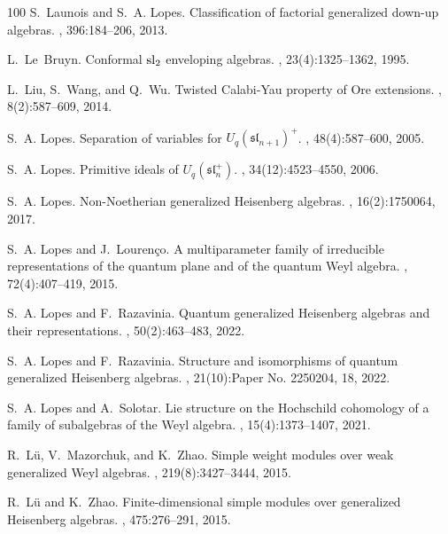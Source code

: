 \documentclass{commat}
\begin{document}
\begin{thebibliography}{100}
S.~Launois and S.~A. Lopes.
\newblock Classification of factorial generalized down-up algebras.
, 396:184--206, 2013.

L.~Le~Bruyn.
\newblock Conformal {${\rm sl}_2$} enveloping algebras.
, 23(4):1325--1362, 1995.

L.~Liu, S.~Wang, and Q.~Wu.
\newblock Twisted {C}alabi-{Y}au property of {O}re extensions.
, 8(2):587--609, 2014.

S.~A. Lopes.
\newblock Separation of variables for {$U_q(\mathfrak{sl}_{n+1})^+$}.
, 48(4):587--600, 2005.

S.~A. Lopes.
\newblock Primitive ideals of {$U_q(\mathfrak {sl}^+_n)$}.
, 34(12):4523--4550, 2006.

S.~A. Lopes.
\newblock Non-{N}oetherian generalized {H}eisenberg algebras.
, 16(2):1750064, 2017.

S.~A. Lopes and J.~Louren{\c c}o.
\newblock A multiparameter family of irreducible representations of the quantum
  plane and of the quantum {W}eyl algebra.
, 72(4):407--419, 2015.

S.~A. Lopes and F.~Razavinia.
\newblock Quantum generalized {H}eisenberg algebras and their representations.
, 50(2):463--483, 2022.

S.~A. Lopes and F.~Razavinia.
\newblock Structure and isomorphisms of quantum generalized {H}eisenberg
  algebras.
, 21(10):Paper No. 2250204, 18, 2022.

S.~A. Lopes and A.~Solotar.
\newblock Lie structure on the {H}ochschild cohomology of a family of
  subalgebras of the {W}eyl algebra.
, 15(4):1373--1407, 2021.

R.~L{\"u}, V.~Mazorchuk, and K.~Zhao.
\newblock Simple weight modules over weak generalized {W}eyl algebras.
, 219(8):3427--3444, 2015.

R.~L{\"u} and K.~Zhao.
\newblock Finite-dimensional simple modules over generalized {H}eisenberg
  algebras.
, 475:276--291, 2015.


\end{thebibliography}
\end{document}
